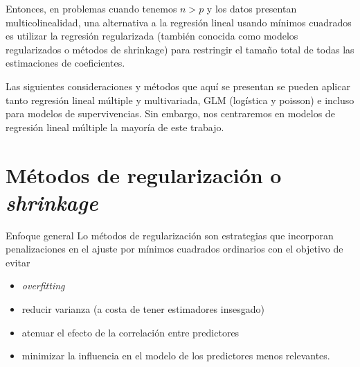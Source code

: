 \begin{frame}
Entonces, en problemas cuando tenemos $n>p$ y los datos presentan multicolinealidad, una alternativa a la regresión lineal usando mínimos cuadrados es utilizar la regresión regularizada (también conocida como modelos regularizados o métodos de shrinkage) para restringir el tamaño total de todas las estimaciones de coeficientes.

\begin{rr}
Las siguientes consideraciones y métodos que aquí se presentan se pueden aplicar tanto regresión lineal múltiple y multivariada, GLM (logística y poisson) e incluso para modelos de supervivencias. Sin embargo, nos centraremos en modelos de regresión lineal múltiple la mayoría de este trabajo.
\end{rr}

\end{frame}

\section{Métodos de regularización o \textit{shrinkage}}
\begin{frame}{Enfoque general}
    Lo métodos de regularización son estrategias que incorporan penalizaciones en el ajuste por mínimos cuadrados ordinarios con el objetivo de evitar
    
    \begin{itemize}
        \item \textit{overfitting}
        \item reducir varianza (a costa de tener estimadores insesgado)
        \item atenuar el efecto de la correlación entre predictores
        \item minimizar la influencia en el modelo de los predictores menos relevantes. 
    \end{itemize}
\end{frame}


